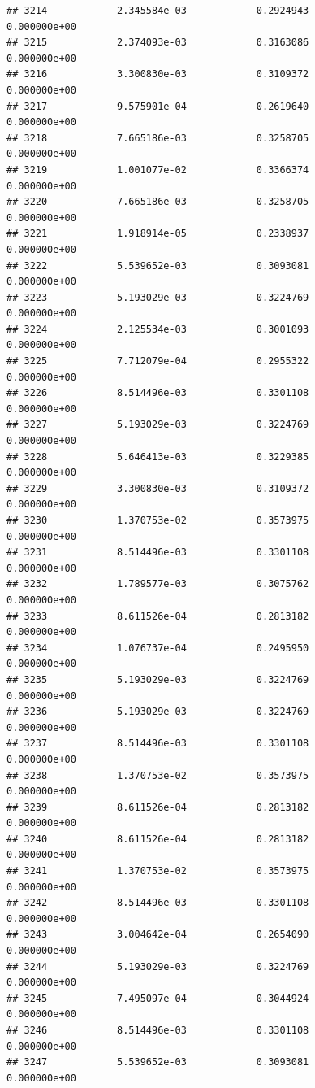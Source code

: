 \documentclass[
]{article}
\begin{document}
\begin{verbatim}
## 3214            2.345584e-03            0.2924943            0.000000e+00
## 3215            2.374093e-03            0.3163086            0.000000e+00
## 3216            3.300830e-03            0.3109372            0.000000e+00
## 3217            9.575901e-04            0.2619640            0.000000e+00
## 3218            7.665186e-03            0.3258705            0.000000e+00
## 3219            1.001077e-02            0.3366374            0.000000e+00
## 3220            7.665186e-03            0.3258705            0.000000e+00
## 3221            1.918914e-05            0.2338937            0.000000e+00
## 3222            5.539652e-03            0.3093081            0.000000e+00
## 3223            5.193029e-03            0.3224769            0.000000e+00
## 3224            2.125534e-03            0.3001093            0.000000e+00
## 3225            7.712079e-04            0.2955322            0.000000e+00
## 3226            8.514496e-03            0.3301108            0.000000e+00
## 3227            5.193029e-03            0.3224769            0.000000e+00
## 3228            5.646413e-03            0.3229385            0.000000e+00
## 3229            3.300830e-03            0.3109372            0.000000e+00
## 3230            1.370753e-02            0.3573975            0.000000e+00
## 3231            8.514496e-03            0.3301108            0.000000e+00
## 3232            1.789577e-03            0.3075762            0.000000e+00
## 3233            8.611526e-04            0.2813182            0.000000e+00
## 3234            1.076737e-04            0.2495950            0.000000e+00
## 3235            5.193029e-03            0.3224769            0.000000e+00
## 3236            5.193029e-03            0.3224769            0.000000e+00
## 3237            8.514496e-03            0.3301108            0.000000e+00
## 3238            1.370753e-02            0.3573975            0.000000e+00
## 3239            8.611526e-04            0.2813182            0.000000e+00
## 3240            8.611526e-04            0.2813182            0.000000e+00
## 3241            1.370753e-02            0.3573975            0.000000e+00
## 3242            8.514496e-03            0.3301108            0.000000e+00
## 3243            3.004642e-04            0.2654090            0.000000e+00
## 3244            5.193029e-03            0.3224769            0.000000e+00
## 3245            7.495097e-04            0.3044924            0.000000e+00
## 3246            8.514496e-03            0.3301108            0.000000e+00
## 3247            5.539652e-03            0.3093081            0.000000e+00

\end{verbatim}
\end{document}

